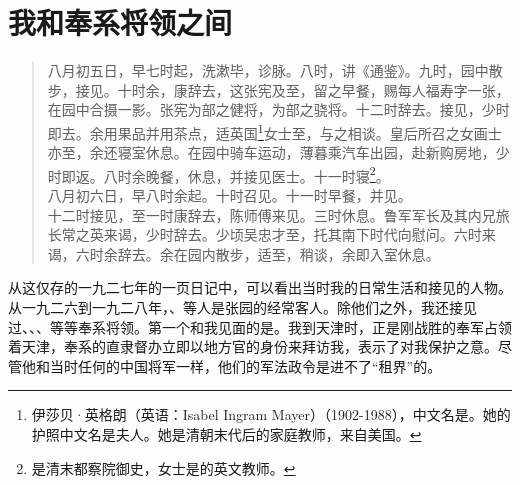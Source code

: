 \fancyhead[RO]{} %
\fancyhead[LE]{} %
\chapter*{我和奉系将领之间}
\thispagestyle{empty}
\begin{quote}
	八月初五日，早七时起，洗漱毕，诊脉。八时，讲《通鉴》。九时，园中散步，接见。十时余，康辞去，这张宪及至，留之早餐，赐每人福寿字一张，在园中合摄一影。张宪为部之健将，为部之骁将。十二时辞去。接见，少时即去。余用果品并用茶点，适英国\footnote{伊莎贝·英格朗（英语：Isabel Ingram Mayer）（1902-1988），中文名是。她的护照中文名是夫人。她是清朝末代后的家庭教师，来自美国。}女士至，与之相谈。皇后所召之女画士亦至，余还寝室休息。在园中骑车运动，薄暮乘汽车出园，赴新购房地，少时即返。八时余晚餐，休息，并接见医士。十一时寝\footnote{是清末都察院御史，女士是的英文教师。}。\\

八月初六日，早八时余起。十时召见。十一时早餐，并见。\\

十二时接见，至一时康辞去，陈师傅来见。三时休息。鲁军军长及其内兄旅长常之英来谒，少时辞去。少顷吴忠才至，托其南下时代向慰问。六时来谒，六时余辞去。余在园内散步，适至，稍谈，余即入室休息。\\
\end{quote}

从这仅存的一九二七年的一页日记中，可以看出当时我的日常生活和接见的人物。从一九二六到一九二八年，、等人是张园的经常客人。除他们之外，我还接见过、、、等等奉系将领。第一个和我见面的是。我到天津时，正是刚战胜的奉军占领着天津，奉系的直隶督办立即以地方官的身份来拜访我，表示了对我保护之意。尽管他和当时任何的中国将军一样，他们的军法政令是进不了“租界”的。\\

